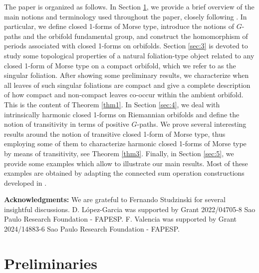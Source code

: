 \documentclass[
  a4paper, 
  reqno, 
  oneside, 
  12pt
]{amsart}
\theoremstyle{definition}
\theoremstyle{remark}
\begin{document}
The paper is organized as follows. In Section \ref{sec:2}, we provide a brief overview of the main notions and terminology used throughout the paper, closely following \cite{V}. In particular, we define closed 1-forms of Morse type, introduce the notions of $G$-paths and the orbifold fundamental group, and construct the homomorphism of periods associated with closed 1-forms on orbifolds. Section \ref{sec:3} is devoted to study some topological properties of a natural foliation-type object related to any closed 1-form of Morse type on a compact orbifold, which we refer to as the singular foliation. After showing some preliminary results, we characterize when all leaves of such singular foliations are compact and give a complete description of how compact and non-compact leaves co-occur within the ambient orbifold. This is the content of Theorem \ref{thm1}. In Section \ref{sec:4}, we deal with intrinsically harmonic closed 1-forms on Riemannian orbifolds and define the notion of transitivity in terms of positive $G$-paths. We prove several interesting results around the notion of transitive closed 1-form of Morse type, thus employing some of them to characterize harmonic closed 1-forms of Morse type by means of transitivity, see Theorem \ref{thm3}. Finally, in Section \ref{sec:5}, we provide some examples which allow to illustrate our main results. Most of these examples are obtained by adapting the connected sum operation constructions developed in \cite{FKL}.










\vspace{.2cm}
{\bf Acknowledgments:}  We are grateful to Fernando Studzinski for several insightful discussions. D. L\'opez-Garcia was supported by Grant 2022/04705-8 Sao Paulo Research Foundation - FAPESP. F. Valencia was supported by Grant 2024/14883-6 Sao Paulo Research Foundation - FAPESP.


\section{Preliminaries}\label{sec:2}
\end{document}
